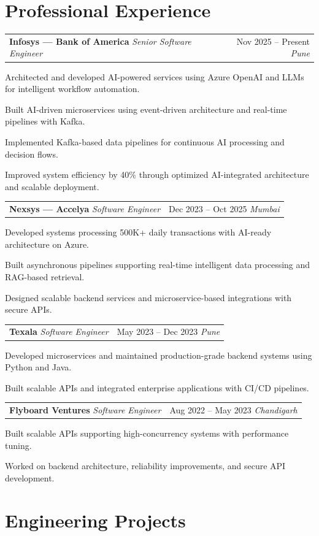 \documentclass[10pt, letterpaper]{article}
\makeatletter
\newcommand{\resumeitem}[1]{\item\small{#1}}
\newcommand{\jobheading}[4]{%
  \noindent
  \begin{tabularx}{\textwidth}{@{}X r@{}}
    \textbf{\color{primary}#1} \textbar{} \textit{\small\color{subtle}#2} &
    \small\color{subtle}#3 \textbar{} \textit{\small #4}
  \end{tabularx}%
}
\makeatother
\begin{document}
\section{Professional Experience}

\jobheading{Infosys --- Bank of America}{Senior Software Engineer}{Nov 2025 -- Present}{Pune}

\begin{jobitems}
\resumeitem{Architected and developed AI-powered services using Azure OpenAI and LLMs for intelligent workflow automation.}
\resumeitem{Built AI-driven microservices using event-driven architecture and real-time pipelines with Kafka.}
\resumeitem{Implemented Kafka-based data pipelines for continuous AI processing and decision flows.}
\resumeitem{Improved system efficiency by 40\% through optimized AI-integrated architecture and scalable deployment.}
\end{jobitems}

\jobheading{Nexsys --- Accelya}{Software Engineer}{Dec 2023 -- Oct 2025}{Mumbai}

\begin{jobitems}
\resumeitem{Developed systems processing 500K+ daily transactions with AI-ready architecture on Azure.}
\resumeitem{Built asynchronous pipelines supporting real-time intelligent data processing and RAG-based retrieval.}
\resumeitem{Designed scalable backend services and microservice-based integrations with secure APIs.}
\end{jobitems}

\jobheading{Texala}{Software Engineer}{May 2023 -- Dec 2023}{Pune}

\begin{jobitems}
\resumeitem{Developed microservices and maintained production-grade backend systems using Python and Java.}
\resumeitem{Built scalable APIs and integrated enterprise applications with CI/CD pipelines.}
\end{jobitems}

\jobheading{Flyboard Ventures}{Software Engineer}{Aug 2022 -- May 2023}{Chandigarh}

\begin{jobitems}
\resumeitem{Built scalable APIs supporting high-concurrency systems with performance tuning.}
\resumeitem{Worked on backend architecture, reliability improvements, and secure API development.}
\end{jobitems}

\section{Engineering Projects}
\end{document}

